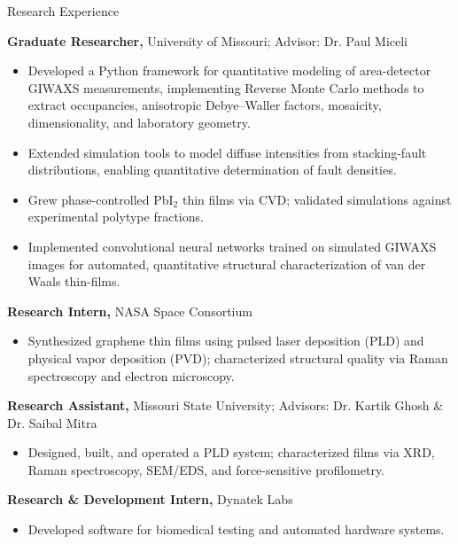\begin{rubric}{Research Experience}

    \entry*[2021 -- Present]%
    \textbf{Graduate Researcher,} University of Missouri; Advisor: Dr. Paul Miceli
    \begin{itemize}
        \item Developed a Python framework for quantitative modeling of area-detector GIWAXS measurements, implementing Reverse Monte Carlo methods to extract occupancies, anisotropic Debye--Waller factors, mosaicity, dimensionality, and laboratory geometry.
        \item Extended simulation tools to model diffuse intensities from stacking-fault distributions, enabling quantitative determination of fault densities.
        \item Grew phase-controlled PbI$_2$ thin films via CVD; validated simulations against experimental polytype fractions.
        \item Implemented convolutional neural networks trained on simulated GIWAXS images for automated, quantitative structural characterization of van der Waals thin-films.
    \end{itemize}

    \entry*[2019 -- 2020]%
        \textbf{Research Intern,} NASA Space Consortium
        \begin{itemize}
            \item Synthesized graphene thin films using pulsed laser deposition (PLD) and physical vapor deposition (PVD); characterized structural quality via Raman spectroscopy and electron microscopy.
        \end{itemize}

    \entry*[2017 -- 2020]%
        \textbf{Research Assistant,} Missouri State University; Advisors: Dr. Kartik Ghosh \& Dr. Saibal Mitra
        \begin{itemize}
        \item Designed, built, and operated a PLD system; characterized films via XRD, Raman spectroscopy, SEM/EDS, and force-sensitive profilometry.
        \end{itemize}


    \entry*[2019]%
        \textbf{Research \& Development Intern,} Dynatek Labs
        \begin{itemize}
            \item Developed software for biomedical testing and automated hardware systems.
        \end{itemize}
\end{rubric}

